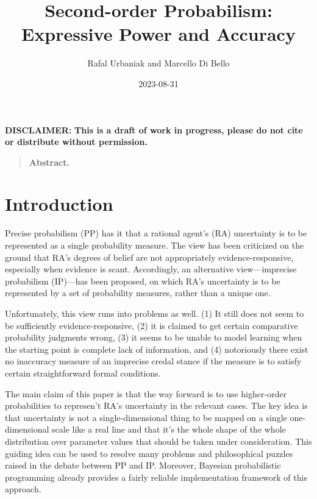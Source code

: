 \documentclass[
  10pt,
  dvipsnames,enabledeprecatedfontcommands]{scrartcl}
\title{Second-order Probabilism: Expressive Power and Accuracy}
\author{Rafal Urbaniak and Marcello Di Bello}
\date{2023-08-31}
\begin{document}
\maketitle

{
\hypersetup{linkcolor=}
\setcounter{tocdepth}{2}
\tableofcontents
}
\vspace{2cm}

\noindent \textbf{DISCLAIMER:}
\textbf{This is a draft of work in progress, please do not cite or distribute without permission.}

\thispagestyle{empty}

\newpage

\begin{quote} \textbf{Abstract.}  

\end{quote}

\hypertarget{introduction}{%
\section{Introduction}\label{introduction}}

\label{sec:introduction}

Precise probabilism (PP) has it that a rational agent's (RA) uncertainty
is to be represented as a single probability measure. The view has been
criticized on the ground that RA's degrees of belief are not
appropriately evidence-responsive, especially when evidence is scant.
Accordingly, an alternative view---imprecise probabilism (IP)---has been
proposed, on which RA's uncertainty is to be represented by a set of
probability measures, rather than a unique one.

Unfortunately, this view runs into problems as well. (1) It still does
not seem to be sufficiently evidence-responsive, (2) it is claimed to
get certain comparative probability judgments wrong, (3) it seems to be
unable to model learning when the starting point is complete lack of
information, and (4) notoriously there exist no inaccuracy measure of an
imprecise credal stance if the measure is to satisfy certain
straightforward formal conditions.


The main claim of this paper is that the way forward is to use
higher-order probabilities to represen't RA's uncertainty in the
relevant cases. The key idea is that uncertainty is not a
single-dimensional thing to be mapped on a single one-dimensional scale
like a real line and that it's the whole shape of the whole distribution
over parameter values that should be taken under consideration. This
guiding idea can be used to resolve many problems and philosophical
puzzles raised in the debate between PP and IP. Moreover, Bayesian
probabilistic programming already provides a fairly reliable
implementation framework of this approach.
\end{document}
